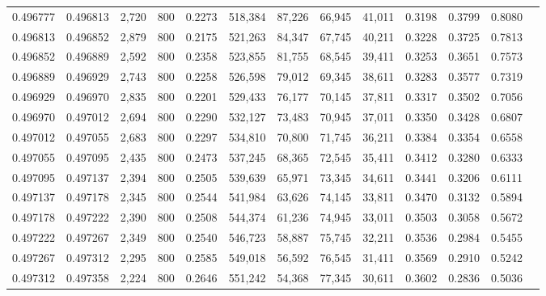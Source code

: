\begin{tabular}{rrrrrrrrrrrrr}
0.496777 & 0.496813 &  2,720 & 800 &                                     0.2273 & 518,384 &  87,226 &  66,945 &  41,011 & 0.3198 & 0.3799 & 0.8080 \\
0.496813 & 0.496852 &  2,879 & 800 &                                     0.2175 & 521,263 &  84,347 &  67,745 &  40,211 & 0.3228 & 0.3725 & 0.7813 \\
0.496852 & 0.496889 &  2,592 & 800 &                                     0.2358 & 523,855 &  81,755 &  68,545 &  39,411 & 0.3253 & 0.3651 & 0.7573 \\
0.496889 & 0.496929 &  2,743 & 800 &                                     0.2258 & 526,598 &  79,012 &  69,345 &  38,611 & 0.3283 & 0.3577 & 0.7319 \\
0.496929 & 0.496970 &  2,835 & 800 &                                     0.2201 & 529,433 &  76,177 &  70,145 &  37,811 & 0.3317 & 0.3502 & 0.7056 \\
0.496970 & 0.497012 &  2,694 & 800 &                                     0.2290 & 532,127 &  73,483 &  70,945 &  37,011 & 0.3350 & 0.3428 & 0.6807 \\
0.497012 & 0.497055 &  2,683 & 800 &                                     0.2297 & 534,810 &  70,800 &  71,745 &  36,211 & 0.3384 & 0.3354 & 0.6558 \\
0.497055 & 0.497095 &  2,435 & 800 &                                     0.2473 & 537,245 &  68,365 &  72,545 &  35,411 & 0.3412 & 0.3280 & 0.6333 \\
0.497095 & 0.497137 &  2,394 & 800 &                                     0.2505 & 539,639 &  65,971 &  73,345 &  34,611 & 0.3441 & 0.3206 & 0.6111 \\
0.497137 & 0.497178 &  2,345 & 800 &                                     0.2544 & 541,984 &  63,626 &  74,145 &  33,811 & 0.3470 & 0.3132 & 0.5894 \\
0.497178 & 0.497222 &  2,390 & 800 &                                     0.2508 & 544,374 &  61,236 &  74,945 &  33,011 & 0.3503 & 0.3058 & 0.5672 \\
0.497222 & 0.497267 &  2,349 & 800 &                                     0.2540 & 546,723 &  58,887 &  75,745 &  32,211 & 0.3536 & 0.2984 & 0.5455 \\
0.497267 & 0.497312 &  2,295 & 800 &                                     0.2585 & 549,018 &  56,592 &  76,545 &  31,411 & 0.3569 & 0.2910 & 0.5242 \\
0.497312 & 0.497358 &  2,224 & 800 &                                     0.2646 & 551,242 &  54,368 &  77,345 &  30,611 & 0.3602 & 0.2836 & 0.5036 \\

\end{tabular}
